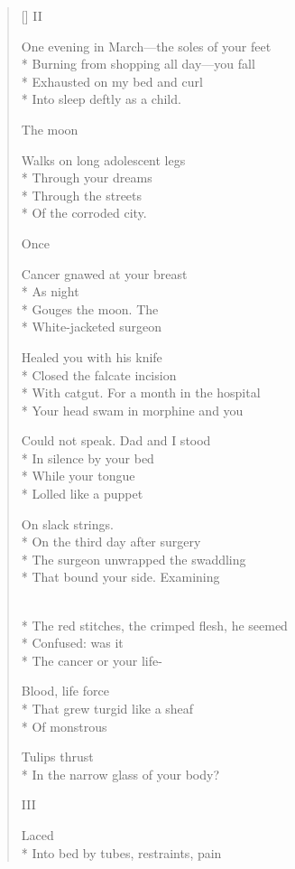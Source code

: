 \begin{verse}[\versewidth]
 \qquad  \qquad  \qquad II

One evening in March---the soles of your feet\\*
Burning from shopping all day---you fall\\*
Exhausted on my bed and curl\\*
Into sleep deftly as a child.

 \qquad  \qquad  \qquad The moon

Walks on long adolescent legs\\*
Through your dreams\\*
Through the streets\\*
Of the corroded city.

 \qquad  \qquad  \qquad Once

Cancer gnawed at your breast\\*
As night\\*
Gouges the moon.  The \\*
White-jacketed surgeon

Healed you with his knife\\*
Closed the falcate incision\\*
With catgut.  For a month in the hospital\\*
Your head swam in morphine and you

Could not speak.  Dad and I stood\\*
In silence by your bed\\*
While your tongue \\*
Lolled like a puppet

On slack strings.\\*
On the third day after surgery\\*
The surgeon unwrapped the swaddling\\*
That bound your side. \qquad Examining

\\*
The red stitches, the crimped flesh, he seemed\\*
Confused: was it\\*
The cancer or your life-

Blood, life force\\*
That grew turgid \qquad like a sheaf\\*
Of monstrous

Tulips thrust\\*
In the narrow glass of your body?

 \qquad  \qquad  \qquad III

 \qquad  \qquad Laced\\*
Into bed by tubes, restraints, pain


\end{verse}
